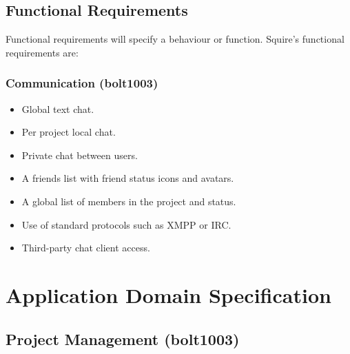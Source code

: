 \documentclass[11pt]{report}
\begin{document}
\section{Functional Requirements}
    Functional requirements will specify a behaviour or function. Squire's functional requirements are:
    
    \subsection{Communication (bolt1003)}
        \begin{itemize}
            \item Global text chat.
            \item Per project local chat.
            \item Private chat between users.
            \item A friends list with friend status icons and avatars.
            \item A global list of members in the project and status.
            \item Use of standard protocols such as XMPP or IRC.
            \item Third-party chat client access.
        \end{itemize}

\chapter{Application Domain Specification}

\section{Project Management (bolt1003)}
\end{document}

